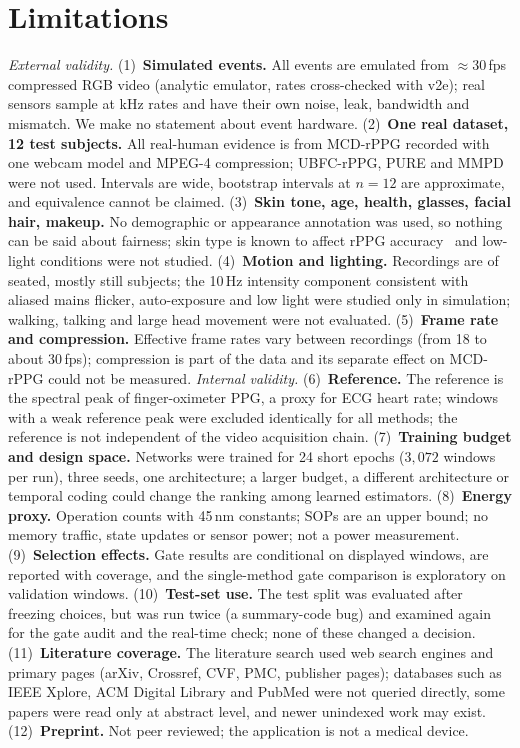 \documentclass[10pt,journal]{IEEEtran}
\begin{document}
\section{Limitations}\label{sec:limits}
\emph{External validity.}
(1)~\textbf{Simulated events.} All events are emulated from $\approx$30\,fps compressed RGB video (analytic emulator, rates cross-checked with v2e); real sensors sample at kHz rates and have their own noise, leak, bandwidth and mismatch. We make no statement about event hardware.
(2)~\textbf{One real dataset, 12 test subjects.} All real-human evidence is from MCD-rPPG recorded with one webcam model and MPEG-4 compression; UBFC-rPPG, PURE and MMPD were not used. Intervals are wide, bootstrap intervals at $n=12$ are approximate, and equivalence cannot be claimed.
(3)~\textbf{Skin tone, age, health, glasses, facial hair, makeup.} No demographic or appearance annotation was used, so nothing can be said about fairness; skin type is known to affect rPPG accuracy~\cite{nowara2020skin} and low-light conditions were not studied.
(4)~\textbf{Motion and lighting.} Recordings are of seated, mostly still subjects; the 10\,Hz intensity component consistent with aliased mains flicker, auto-exposure and low light were studied only in simulation; walking, talking and large head movement were not evaluated.
(5)~\textbf{Frame rate and compression.} Effective frame rates vary between recordings (from 18 to about 30\,fps); compression is part of the data and its separate effect on MCD-rPPG could not be measured.
\emph{Internal validity.}
(6)~\textbf{Reference.} The reference is the spectral peak of finger-oximeter PPG, a proxy for ECG heart rate; windows with a weak reference peak were excluded identically for all methods; the reference is not independent of the video acquisition chain.
(7)~\textbf{Training budget and design space.} Networks were trained for 24 short epochs ($3{,}072$ windows per run), three seeds, one architecture; a larger budget, a different architecture or temporal coding could change the ranking among learned estimators.
(8)~\textbf{Energy proxy.} Operation counts with 45\,nm constants; SOPs are an upper bound; no memory traffic, state updates or sensor power; not a power measurement.
(9)~\textbf{Selection effects.} Gate results are conditional on displayed windows, are reported with coverage, and the single-method gate comparison is exploratory on validation windows.
(10)~\textbf{Test-set use.} The test split was evaluated after freezing choices, but was run twice (a summary-code bug) and examined again for the gate audit and the real-time check; none of these changed a decision.
(11)~\textbf{Literature coverage.} The literature search used web search engines and primary pages (arXiv, Crossref, CVF, PMC, publisher pages); databases such as IEEE Xplore, ACM Digital Library and PubMed were not queried directly, some papers were read only at abstract level, and newer unindexed work may exist.
(12)~\textbf{Preprint.} Not peer reviewed; the application is not a medical device.
\end{document}
